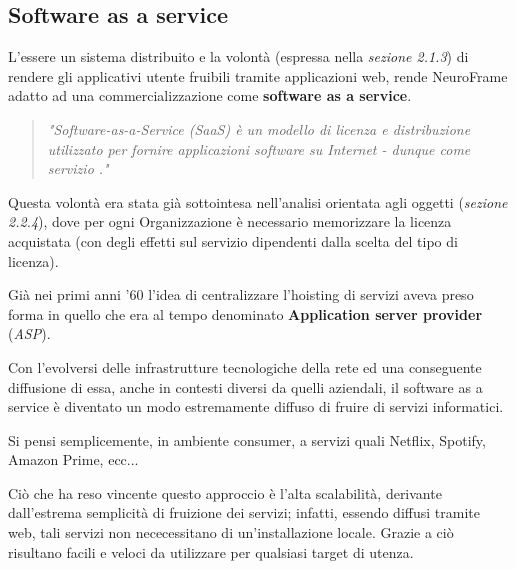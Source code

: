 \subsection{Software as a service}
L'essere un sistema distribuito e la volontà (espressa nella \emph{sezione 2.1.3}) di rendere gli applicativi utente fruibili tramite applicazioni web, rende NeuroFrame adatto ad una commercializzazione come {\bf software as a service}.
\begin{quote}
    \emph{"Software-as-a-Service (SaaS) è un modello di licenza e distribuzione utilizzato per fornire applicazioni software su Internet - dunque come servizio \cite{SaaS}."}
\end{quote}
\noindent Questa volontà era stata già sottointesa nell'analisi orientata agli oggetti (\emph{sezione 2.2.4}), dove per ogni Organizzazione è necessario memorizzare la licenza acquistata (con degli effetti sul servizio dipendenti dalla scelta del tipo di licenza).\newline

\noindent Già nei primi anni '60 l'idea di centralizzare l'hoisting di servizi aveva preso forma in quello che era al tempo denominato {\bf Application server provider} (\emph{ASP}).\newline

\noindent Con l'evolversi delle infrastrutture tecnologiche della rete ed una conseguente diffusione di essa, anche in contesti diversi da quelli aziendali, il software as a service è diventato un modo estremamente diffuso di fruire di servizi informatici.\newline

\noindent Si pensi semplicemente, in ambiente consumer, a servizi quali Netflix, Spotify, Amazon Prime, ecc...\newline

\noindent Ciò che ha reso vincente questo approccio è l'alta scalabilità, derivante dall'estrema semplicità di fruizione dei servizi; infatti, essendo diffusi tramite web, tali servizi non nececessitano di un'installazione locale. Grazie a ciò risultano facili e veloci da utilizzare per qualsiasi target di utenza.